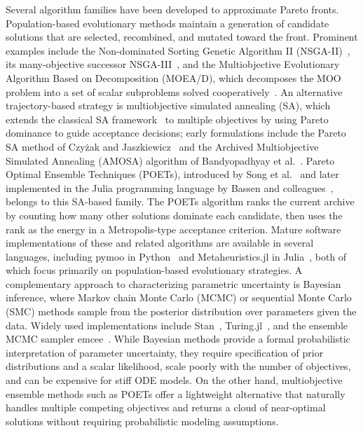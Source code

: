\documentclass[12pt]{article}
\begin{document}
Several algorithm families have been developed to approximate Pareto fronts. Population-based evolutionary methods maintain a generation of candidate solutions that are selected, recombined, and mutated toward the front. Prominent examples include the Non-dominated Sorting Genetic Algorithm II (NSGA-II)~\cite{Deb2002}, its many-objective successor NSGA-III~\cite{Deb2014}, and the Multiobjective Evolutionary Algorithm Based on Decomposition (MOEA/D), which decomposes the MOO problem into a set of scalar subproblems solved cooperatively~\cite{Zhang2007}.
An alternative trajectory-based strategy is multiobjective simulated annealing (SA), which extends the classical SA framework~\cite{Kirkpatrick1983} to multiple objectives by using Pareto dominance to guide acceptance decisions; early formulations include the Pareto SA method of Czy\.{z}ak and Jaszkiewicz~\cite{Czyzak1998} and the Archived Multiobjective Simulated Annealing (AMOSA) algorithm of Bandyopadhyay et al.~\cite{Bandyopadhyay2008}. Pareto Optimal Ensemble Techniques (POETs), introduced by Song et al.~\cite{Song2010} and later implemented in the Julia programming language by Bassen and colleagues~\cite{Bassen2016}, belongs to this SA-based family. The  POETs algorithm ranks the current archive by counting how many other solutions dominate each candidate, then uses the rank as the energy in a Metropolis-type acceptance criterion. Mature software implementations of these and related algorithms are available in several languages, including pymoo in Python~\cite{Blank2020} and Metaheuristics.jl in Julia~\cite{Mejia2022}, both of which focus primarily on population-based evolutionary strategies. A complementary approach to characterizing parametric uncertainty is Bayesian inference, where Markov chain Monte Carlo (MCMC) or sequential Monte Carlo (SMC) methods sample from the posterior distribution over parameters given the data. Widely used implementations include Stan~\cite{Carpenter2017}, Turing.jl~\cite{Ge2018}, and the ensemble MCMC sampler emcee~\cite{ForemanMackey2013}. While Bayesian methods provide a formal probabilistic interpretation of parameter uncertainty, they require specification of prior distributions and a scalar likelihood, scale poorly with the number of objectives, and can be expensive for stiff ODE models. On the other hand, multiobjective ensemble methods such as POETs offer a lightweight alternative that naturally handles multiple competing objectives and returns a cloud of near-optimal solutions without requiring probabilistic modeling assumptions.
\end{document}
